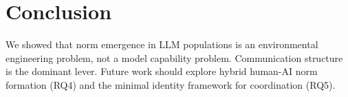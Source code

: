 \section{Conclusion}
\label{sec:conclusion}

We showed that norm emergence in LLM populations is an environmental engineering problem, not a model capability problem. Communication structure is the dominant lever. Future work should explore hybrid human-AI norm formation (RQ4) and the minimal identity framework for coordination (RQ5).
